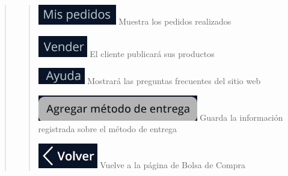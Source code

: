 \documentclass[14pt]{article}
\begin{document}
\begin{quote}
\begin{quote}
                            \includegraphics[height=0.02\textwidth]{BotonMisPedidos.jpg}
                            \label{P6:BotonMisPedidos} Muestra los pedidos realizados
                           
                            \includegraphics[height=0.02\textwidth]{BotonVender.jpg}
                            \label{P6:BotonVender} El cliente publicará sus productos
                            
                            \includegraphics[height=0.02\textwidth]{BotonAyuda.jpg}
                            \label{P6:BotonAyuda} Mostrará las preguntas frecuentes del sitio web
                            
                            \includegraphics[height=0.02\textwidth]{BotonAgregarMetodoDeEntrega.jpg}
                            \label{P6:BotonAgregarMetodoDeEntrega} Guarda la información registrada sobre el método de entrega
                            
                            \includegraphics[height=0.02\textwidth]{BotonVolver.jpg}
                            \label{P6:BotonVolver} Vuelve a la página de Bolsa de Compra
                        \end{quote}
                \end{quote}
            
            \newpage
\end{document}
